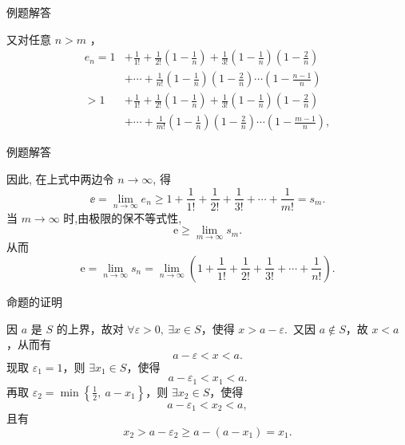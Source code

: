 \documentclass[mathserif]{beamer}
\begin{document}
\begin{frame}{例题解答\hfill\hyperlink{li_bc3<1>}{}}%
	\begin{proofs}
		又对任意 $n>m$ ，
		$$
		\begin{aligned}
			e_n=1 & +\frac{1}{1 !}+\frac{1}{2 !}\left(1-\frac{1}{n}\right)+\frac{1}{3 !}\left(1-\frac{1}{n}\right)\left(1-\frac{2}{n}\right) \\
			& +\cdots+\frac{1}{n !}\left(1-\frac{1}{n}\right)\left(1-\frac{2}{n}\right) \cdots\left(1-\frac{n-1}{n}\right) \\
			>1 & +\frac{1}{1 !}+\frac{1}{2 !}\left(1-\frac{1}{n}\right)+\frac{1}{3 !}\left(1-\frac{1}{n}\right)\left(1-\frac{2}{n}\right) \\
			& +\cdots+\frac{1}{m !}\left(1-\frac{1}{n}\right)\left(1-\frac{2}{n}\right) \cdots\left(1-\frac{m-1}{n}\right),
		\end{aligned}
		$$
	\end{proofs}
\end{frame}



\begin{frame}{例题解答\hfill\hyperlink{li_bc3<1>}{}}%
	\begin{proofs}
		因此, 在上式中两边令 $n \rightarrow \infty$, 得
		$$
		\ee=\lim _{n \rightarrow \infty} e_n \geqslant 1+\frac{1}{1 !}+\frac{1}{2 !}+\frac{1}{3 !}+\cdots+\frac{1}{m !}=s_m .
		$$
		\suojin 当 $m \rightarrow \infty$ 时,由极限的保不等式性, 
		$$\mathrm{e} \geqslant \lim _{m \rightarrow \infty} s_m.$$
		从而
		$$
		\mathrm{e}=\lim _{n \rightarrow \infty} s_n=\lim _{n \rightarrow \infty}\left(1+\frac{1}{1 !}+\frac{1}{2 !}+\frac{1}{3 !}+\cdots+\frac{1}{n !}\right) .
		$$
	\end{proofs}		
\end{frame}






\begin{frame}[label=qjslzm]{命题的证明\hfill\hyperlink{qjsl<1>}{}}%
	\begin{proofs}
		\suojin  因 $a$ 是 $S$ 的上界，故对 $\forall \varepsilon>0,\ \exists x \in S$，使得 $x>a-\varepsilon$.\ 又因 $a \notin S$，故 $x<a$，从而有
		$$
		a-\varepsilon<x<a.
		$$
		现取 $\varepsilon_1=1$，则 $\exists x_1 \in S$，使得
		$$
		a-\varepsilon_1<x_1<a .
		$$
		再取 $\varepsilon_2=\min \left\{\frac{1}{2},\ a-x_1\right\}$，则 $\exists x_2 \in S$，使得  
		$$
		a-\varepsilon_1<x_2<a,
		$$
		且有 $$x_2>a-\varepsilon_2 \geq a-\left(a-x_1\right)=x_1.$$
	\end{proofs}
\end{frame}
\end{document}
